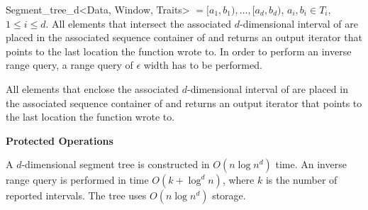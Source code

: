 \begin{ccClassTemplate} {Segment_tree_d<Data, Window, Traits>}
{ $=[a_1,b_1),\ldots , [a_d,b_d)$, $a_i,b_i\in T_i$, $1\le
    i\le d$. All elements that
  intersect the associated $d$-dimensional interval of
 are placed in the
associated sequence container of    and
returns an
output iterator that points
to the last location the function wrote to.
In order to perform an inverse range query, a range query of
$\epsilon$ width has to be performed.
}

%
{ All elements that
  enclose the associated $d$-dimensional interval of
 are placed in the
associated sequence container of    and returns an output iterator that points
to the last location the function wrote to.}


{\bf Protected Operations}




\ccImplementation

A $d$-dimensional segment tree is constructed in ${O}(n\log n^d)$ time.
An inverse range query is performed in time ${O}(k+{\log}^d n )$, where $k$
is the number of reported intervals.
The tree uses ${O}(n\log n^d)$ storage.
\end{ccClassTemplate}


